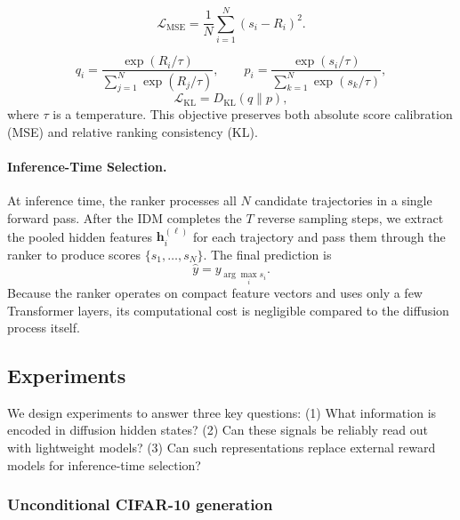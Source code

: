 \documentclass{article}
\begin{document}
\begin{equation}
    \mathcal{L}_{\text{MSE}} = \frac{1}{N} \sum_{i=1}^{N}(s_i - R_i)^2.
\end{equation}

\begin{equation}
    q_i = \frac{\exp(R_i/\tau)}{\sum_{j=1}^{N}\exp(R_j/\tau)}, \qquad
    p_i = \frac{\exp(s_i/\tau)}{\sum_{k=1}^{N}\exp(s_k/\tau)},
    \label{eq:q_i}
\end{equation}
\begin{equation}
    \mathcal{L}_{\text{KL}} = D_{\mathrm{KL}}(q \| p),
\end{equation}
where $\tau$ is a temperature. This objective preserves both absolute score calibration (MSE) and relative ranking consistency (KL).

\paragraph{Inference-Time Selection.}

At inference time, the ranker processes all $N$ candidate trajectories in a single forward pass. After the IDM completes the $T$ reverse sampling steps, we extract the pooled hidden features $\mathbf{h}_i^{(\ell)}$ for each trajectory and pass them through the ranker to produce scores $\{s_1, \ldots, s_N\}$. The final prediction is
\begin{equation}
\hat{y} = y_{\arg\max_{i} s_i}.
\label{eq:selection}
\end{equation}
Because the ranker operates on compact feature vectors and uses only a few Transformer layers, its computational cost is negligible compared to the diffusion process itself.


\subsection{Experiments}
We design experiments to answer three key questions:
(1) What information is encoded in diffusion hidden states?
(2) Can these signals be reliably read out with lightweight models?
(3) Can such representations replace external reward models for inference-time selection?

\subsubsection{Unconditional CIFAR-10 generation}
\label{sec:exp_uncond_cifar10}
\end{document}

